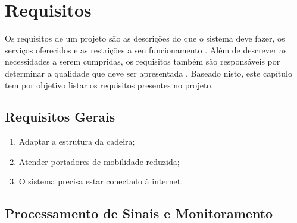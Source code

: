 \chapter{Requisitos}

Os requisitos de um projeto são as descrições do que o sistema deve fazer, os
serviços oferecidos e as restrições a seu funcionamento \cite{sommerville}.
Além de descrever as necessidades a serem cumpridas, os requisitos também são
responsáveis por determinar a qualidade que deve ser apresentada \cite{robertson}.
Baseado nisto, este capítulo tem por objetivo listar os requisitos presentes
no projeto.

\section{Requisitos Gerais}

\begin{enumerate}
  \item Adaptar a estrutura da cadeira;
  \item Atender portadores de mobilidade reduzida;
  \item O sistema precisa estar conectado à internet.
\end{enumerate}

\section{Processamento de Sinais e Monitoramento}

